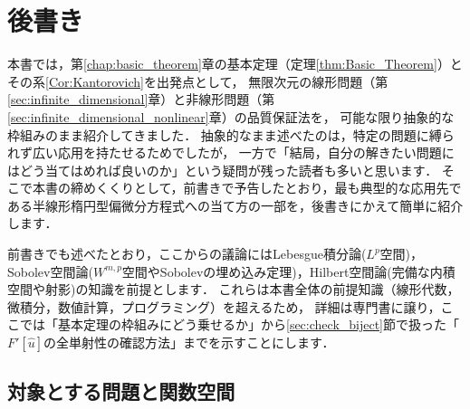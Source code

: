 \chapter*{後書き}
{}
\label{chap:afterword}

本書では，第\ref{chap:basic_theorem}章の基本定理（定理\ref{thm:Basic_Theorem}）とその系\ref{Cor:Kantorovich}を出発点として，
無限次元の線形問題（第\ref{sec:infinite_dimensional}章）と非線形問題（第\ref{sec:infinite_dimensional_nonlinear}章）の品質保証法を，
可能な限り抽象的な枠組みのまま紹介してきました．
抽象的なまま述べたのは，特定の問題に縛られず広い応用を持たせるためでしたが，
一方で「結局，自分の解きたい問題にはどう当てはめれば良いのか」という疑問が残った読者も多いと思います．
そこで本書の締めくくりとして，前書きで予告したとおり，最も典型的な応用先である半線形楕円型偏微分方程式への当て方の一部を，後書きにかえて簡単に紹介します．

前書きでも述べたとおり，ここからの議論にはLebesgue積分論($L^p$空間)，Sobolev空間論($W^{m,p}$空間やSobolevの埋め込み定理)，Hilbert空間論(完備な内積空間や射影)の知識を前提とします．
これらは本書全体の前提知識（線形代数，微積分，数値計算，プログラミング）を超えるため，
詳細は専門書に譲り，ここでは「基本定理の枠組みにどう乗せるか」から\ref{sec:check_biject}節で扱った「$F'[\hat{u}]$の全単射性の確認方法」までを示すことにします．


\section*{対象とする問題と関数空間}

